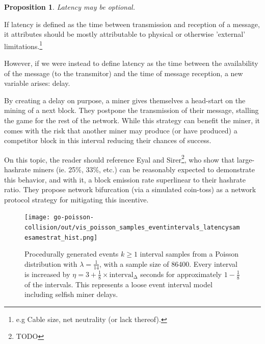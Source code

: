 \documentclass[11pt]{article}
\theoremstyle{plain}
\newtheorem{proposition}{Proposition}[section]
\begin{document}
\vspace{5mm}
\begin{proposition}
  Latency may be optional.
\end{proposition}

If latency is defined as the time between transmission and reception of a
message, it attributes should be mostly attributable to physical or
otherwise 'external' limitations.\nolinebreak\footnote{
e.g Cable size, net neutrality (or lack thereof).
}

However, if we were instead to define latency as the time between the availability
of the message (to the transmitor) and the time of message reception,
a new variable arises: delay.

By creating a delay on purpose, a miner gives themselves a head-start
on the mining of a next block. They postpone the transmission of their message,
stalling the game for the rest of the network. While this strategy can benefit
the miner, it comes with the risk that another miner may produce (or have
produced) a competitor block in this interval reducing their chances of success.

On this topic, the reader should reference Eyal and Sirer\footnote{TODO}, who
show that large-hashrate miners (ie. 25\%, 33\%, etc.) can be reasonably
expected to demonstrate this behavior, and with it, a block emission
rate superlinear to their hashrate ratio. They propose network bifurcation
(via a simulated coin-toss) as a network protocol strategy for mitigating
this incentive.

\begin{figure}[tph]
    \centering

    \texttt{[image: go-poisson-collision/out/vis\_poisson\_samples\_eventintervals\_latencysamesamestrat\_hist.png]}
    \caption{
        Procedurally generated events $k \geq 1$ interval samples from a Poisson distribution
        with $\lambda = \frac{1}{14}$, with a sample size of 86400.
        Every interval is increased by $\eta=3 + \frac{1}{8} \times \mathrm{interval_{\Delta}}$ seconds for approximately
        $1-\frac{1}{8}$ of the intervals.
        This represents a loose event interval model including selfish miner delays.
    }
\end{figure}


%
%
\end{document}
